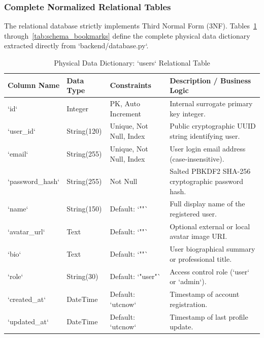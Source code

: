 \subsubsection{Complete Normalized Relational Tables}
The relational database strictly implements Third Normal Form (3NF). Tables~\ref{tab:schema_users} through~\ref{tab:schema_bookmarks} define the complete physical data dictionary extracted directly from `backend/database.py`.

\begin{table}[H]
\caption{Physical Data Dictionary: `users` Relational Table}
\label{tab:schema_users}
\centering
\small
\begin{tabularx}{\textwidth}{lp{2.8cm}p{2.5cm}X}
\toprule
\textbf{Column Name} & \textbf{Data Type} & \textbf{Constraints} & \textbf{Description / Business Logic} \\
\midrule
`id` & Integer & PK, Auto Increment & Internal surrogate primary key integer. \\
`user_id` & String(120) & Unique, Not Null, Index & Public cryptographic UUID string identifying user. \\
`email` & String(255) & Unique, Not Null, Index & User login email address (case-insensitive). \\
`password_hash` & String(255) & Not Null & Salted PBKDF2 SHA-256 cryptographic password hash. \\
`name` & String(150) & Default: `""` & Full display name of the registered user. \\
`avatar_url` & Text & Default: `""` & Optional external or local avatar image URI. \\
`bio` & Text & Default: `""` & User biographical summary or professional title. \\
`role` & String(30) & Default: `"user"` & Access control role (`user` or `admin`). \\
`created_at` & DateTime & Default: `utcnow` & Timestamp of account registration. \\
`updated_at` & DateTime & Default: `utcnow` & Timestamp of last profile update. \\
\bottomrule
\end{tabularx}
\end{table}

